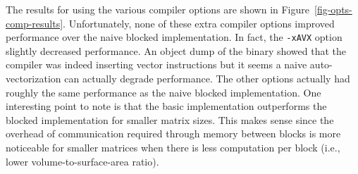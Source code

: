 

The results for using the various compiler options are shown in
Figure~\ref{fig-opts-comp-results}. Unfortunately, none of these extra
compiler options improved performance over the naive blocked
implementation. In fact, the {\tt{-xAVX}} option slightly decreased
performance. An object dump of the binary showed that the compiler was
indeed inserting vector instructions but it seems a naive
auto-vectorization can actually degrade performance. The other options
actually had roughly the same performance as the naive blocked
implementation. One interesting point to note is that the basic
implementation outperforms the blocked implementation for smaller matrix
sizes. This makes sense since the overhead of communication required
through memory between blocks is more noticeable for smaller matrices
when there is less computation per block (i.e., lower
volume-to-surface-area ratio).

\clearpage
